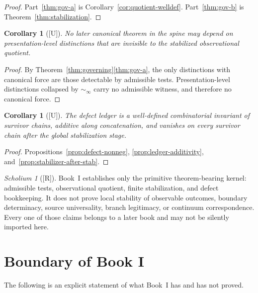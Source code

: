\documentclass[12pt,oneside]{amsbook}
\theoremstyle{plain}
\newtheorem{corollary}[theorem]{Corollary}
\theoremstyle{definition}
\theoremstyle{remark}
\newtheorem{scholium}[theorem]{Scholium}
\newcommand{\status}[1]{\textup{[#1]}}
\begin{document}
\begin{proof}
Part~\ref{thm:gov-a} is Corollary~\ref{cor:quotient-welldef}.
Part~\ref{thm:gov-b} is Theorem~\ref{thm:stabilization}.
\end{proof}

\begin{corollary}[\status{U}]\label{cor:no-presentation-surplus}
No later canonical theorem in the spine may depend on
presentation-level distinctions that are invisible to the stabilized
observational quotient.
\end{corollary}

\begin{proof}
By Theorem~\ref{thm:governing}\ref{thm:gov-a}, the only distinctions
with canonical force are those detectable by admissible tests.
Presentation-level distinctions collapsed by $\sim_\infty$ carry no
admissible witness, and therefore no canonical force.
\end{proof}

\begin{corollary}[\status{U}]\label{cor:defect-welldef}
The defect ledger is a well-defined combinatorial invariant of survivor
chains, additive along concatenation, and vanishes on every survivor
chain after the global stabilization stage.
\end{corollary}

\begin{proof}
Propositions~\ref{prop:defect-nonneg}, \ref{prop:ledger-additivity},
and~\ref{prop:stabilizer-after-stab}.
\end{proof}

\begin{scholium}[\status{R}]\label{sch:book-i-boundary}
Book~I establishes only the primitive theorem-bearing kernel: admissible
tests, observational quotient, finite stabilization, and defect
bookkeeping.  It does not prove local stability of observable outcomes,
boundary determinacy, source universality, branch legitimacy, or
continuum correspondence.  Every one of those claims belongs to a
later book and may not be silently imported here.
\end{scholium}

\section{Boundary of Book I}

The following is an explicit statement of what Book~I has and has not
proved.
\end{document}
